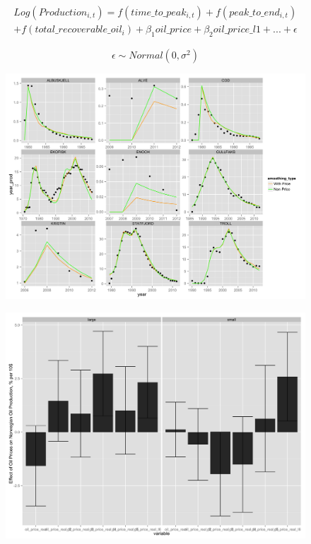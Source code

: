 \documentclass{beamer}
\begin{document}
\begin{frame}[plain]
		\begin{multline}
	\nonumber Log(Production_{i,t})=f(time\_to\_peak_{i,t}) + f(peak\_to\_end_{i,t}) \\
	+ f(total\_recoverable\_oil_i)
	+ \beta_1 oil\_price + \beta_2 oil\_price\_l1 + ... +  \epsilon
	\end{multline}

		\begin{equation}
		\nonumber \epsilon \sim Normal(0, \sigma^2)
		\end{equation}
\end{frame}
\begin{frame}[plain]
	\begin{figure}
	\includegraphics[width=1\textwidth]{price_vs_non_price.png}
	\end{figure}
\end{frame}

\begin{frame}[plain]
	\begin{figure}
	\includegraphics[width=1\textwidth]{coeff_split_plot.png}
	\end{figure}
\end{frame}
\end{document}
